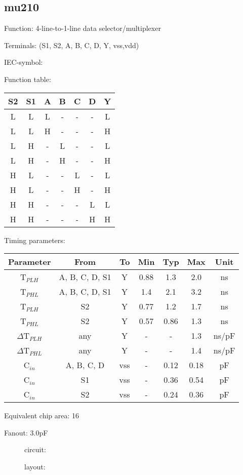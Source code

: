 \subsection{mu210}

Function: 4-line-to-1-line data selector/multiplexer

Terminals: (S1, S2, A, B, C, D, Y, vss,vdd)


IEC-symbol:
\begin{figure}[bth]
\end{figure}

Function table:
\begin{table}[bth]
\begin{tabular}{|cc|cccc||c|}
\hline
S2	&S1	&A 	&B	&C	&D	&Y\\
\hline
L	&L	&L	&-	&-	&-	&L\\
L	&L	&H	&-	&-	&-	&H\\
L	&H	&- 	&L	&-	&-	&L\\
L	&H	&-	&H	&-	&-	&H\\
H	&L	&-	&-	&L	&-	&L\\
H	&L	&-	&-	&H	&-	&H\\
H	&H	&-	&-	&-	&L	&L\\
H	&H	&-	&-	&-	&H	&H\\
\hline
\end{tabular}
\vspace{.5cm}

	
Timing parameters:\\

\begin{tabular}{|c|cc|ccc|c|}
\hline
Parameter		&From		&To 	&Min	&Typ	&Max	&Unit\\
\hline
T$_{PLH}$		&A, B, C, D, S1	&Y	&0.88	&1.3	&2.0	&ns\\
T$_{PHL}$		&A, B, C, D, S1	&Y	&1.4	&2.1	&3.2	&ns\\
T$_{PLH}$		&S2		&Y	&0.77	&1.2	&1.7	&ns\\
T$_{PHL}$		&S2		&Y	&0.57	&0.86	&1.3	&ns\\
\hline
$\Delta$T$_{PLH}$	&any		&Y	&-	&-	&1.3	&ns/pF\\
$\Delta$T$_{PHL}$	&any		&Y	&-	&-	&1.4	&ns/pF\\
\hline	
C$_{in}$		&A, B, C, D	&vss	&-	&0.12	&0.18	&pF\\
C$_{in}$		&S1		&vss	&-	&0.36	&0.54	&pF\\
C$_{in}$		&S2		&vss	&-	&0.24	&0.36	&pF\\
\hline
\end{tabular}
\end{table}

Equivalent chip area: 16

Fanout: 3.0pF



\begin{figure}[bth]
circuit:\\

\end{figure}



\begin{figure}[bth]
layout:\\

\end{figure}


\clearpage






